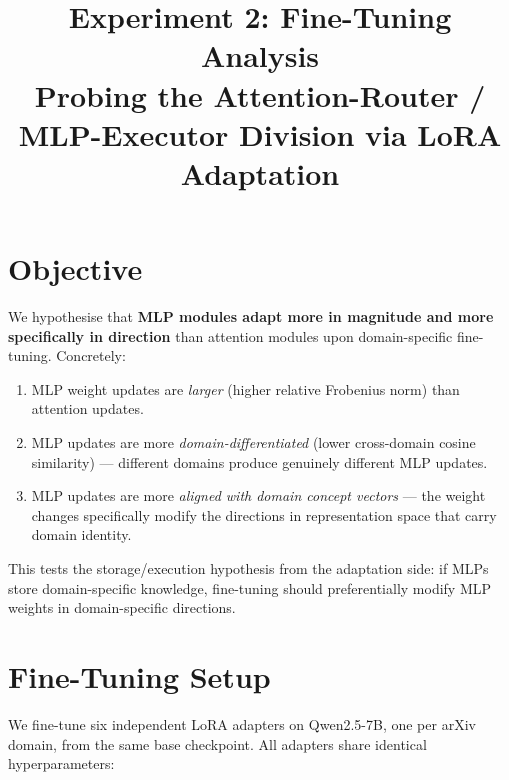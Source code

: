 \documentclass[11pt,a4paper]{article}
\title{Experiment 2: Fine-Tuning Analysis\\[4pt]
\large Probing the Attention-Router / MLP-Executor Division via LoRA Adaptation}
\author{}
\date{}
\begin{document}
\maketitle

\section{Objective}

We hypothesise that \textbf{MLP modules adapt more in magnitude and more specifically in direction} than attention modules upon domain-specific fine-tuning. Concretely:
\begin{enumerate}
    \item MLP weight updates are \emph{larger} (higher relative Frobenius norm) than attention updates.
    \item MLP updates are more \emph{domain-differentiated} (lower cross-domain cosine similarity) --- different domains produce genuinely different MLP updates.
    \item MLP updates are more \emph{aligned with domain concept vectors} --- the weight changes specifically modify the directions in representation space that carry domain identity.
\end{enumerate}

This tests the storage/execution hypothesis from the adaptation side: if MLPs store domain-specific knowledge, fine-tuning should preferentially modify MLP weights in domain-specific directions.

\section{Fine-Tuning Setup}

We fine-tune six independent LoRA adapters on Qwen2.5-7B, one per arXiv domain, from the same base checkpoint. All adapters share identical hyperparameters:
\end{document}
